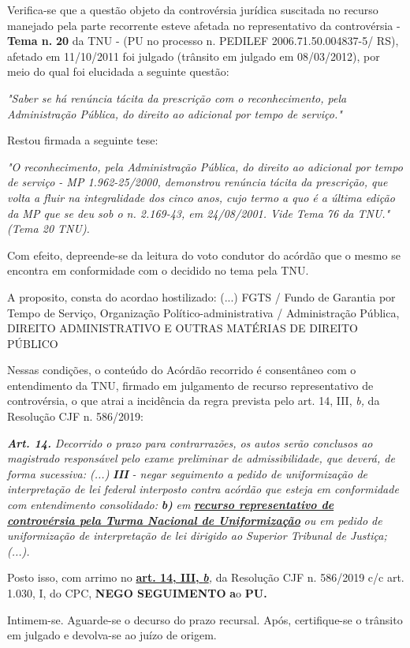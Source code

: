 \documentclass[12pt]{article}
\begin{document}
\justifying
\noindent Verifica-se que a questão objeto da controvérsia jurídica suscitada no recurso manejado pela parte recorrente esteve afetada no representativo da controvérsia - \textbf{Tema n. }\textbf{20} da TNU - (PU no processo n. PEDILEF 2006.71.50.004837-5/ RS),  afetado em 11/10/2011 foi julgado (trânsito em julgado em 08/03/2012), por meio do qual foi elucidada a seguinte questão:

\noindent \textit{"Saber se há renúncia tácita da prescrição com o reconhecimento, pela Administração Pública, do direito ao adicional por tempo de serviço."}

\noindent Restou firmada a seguinte tese:

\noindent \textit{"O reconhecimento, pela Administração Pública, do direito ao adicional por tempo de serviço - MP 1.962-25/2000, demonstrou renúncia tácita da prescrição, que volta a fluir na integralidade dos cinco anos, cujo termo a quo é a última edição da MP que se deu sob o n. 2.169-43, em 24/08/2001. Vide Tema 76 da TNU." (Tema 20 TNU).}

\noindent Com efeito, depreende-se da leitura do voto condutor do acórdão que o mesmo se encontra em conformidade com o decidido no  tema pela TNU.

\noindent A proposito, consta do acordao hostilizado: (...) FGTS / Fundo de Garantia por Tempo de Serviço, Organização Político-administrativa / Administração Pública, DIREITO ADMINISTRATIVO E OUTRAS MATÉRIAS DE DIREITO PÚBLICO

\noindent Nessas condições, o conteúdo do Acórdão recorrido é consentâneo com o entendimento da TNU, firmado em julgamento de recurso representativo de controvérsia, o que atrai a incidência da regra prevista pelo art. 14, III, \textit{b,} da Resolução CJF n. 586/2019:

\noindent \textit{\textbf{Art. 14.}}\textit{ Decorrido o prazo para contrarrazões, os autos serão conclusos ao magistrado responsável pelo exame preliminar de admissibilidade, que deverá, de forma sucessiva: (...) }\textit{\textbf{III }}\textit{- negar seguimento a pedido de uniformização de interpretação de lei federal interposto contra acórdão que esteja em conformidade com entendimento consolidado: }\textit{\textbf{b)}}\textit{ em }\uline{\textit{\textbf{recurso representativo de controvérsia pela Turma Nacional de Uniformização}}}\textit{ ou em pedido de uniformização de interpretação de lei dirigido ao Superior Tribunal de Justiça;(...).}

\noindent Posto isso, com arrimo no \uline{\textbf{art. 14, III, }}\uline{\textit{\textbf{b}}}\textit{,} da Resolução CJF n. 586/2019 c/c art. 1.030, I, do CPC, \textbf{NEGO SEGUIMENTO }\textbf{a}o\textbf{ PU}\textbf{.}

\noindent Intimem-se. Aguarde-se o decurso do prazo recursal. Após, certifique-se o trânsito em julgado e devolva-se ao juízo de origem.
\end{document}

